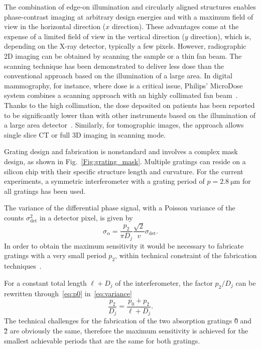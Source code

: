 The combination of edge-on illumination and circularly aligned structures
enables phase-contrast imaging at arbitrary design energies and with a
maximum field of view in the horizontal direction ($x$ direction). These
advantages come at the expense of a limited field of view in the vertical
direction ($y$ direction), which is, depending on the X-ray detector,
typically a few pixels. However, radiographic 2D imaging can be obtained by
scanning the sample or a thin fan beam. The scanning technique has been
demonstrated to deliver less dose than the conventional approach based on
the illumination of a large area. In digital mammography, for instance,
where dose is a critical issue, Philips' MicroDose system combines a
scanning approach with an highly collimated fan beam~\cite{Aslund2007}.
Thanks to the high collimation, the dose deposited on  patients has been
reported to be significantly lower than with other instruments based on the
illumination of a large area detector~\cite{Oduko2010}. Similarly, for
tomographic images, the approach allows single slice \ac{CT} or full 3D
imaging in scanning mode.

Grating design and fabrication is nonstandard and involves a complex mask
design, as shown in Fig.~\ref{Fig:grating_mask}. Multiple gratings can reside on a
silicon chip with their specific structure length and curvature. For the
current experiments, a symmetric interferometer with a grating period of $p
= \SI{2.8}{\micro\metre}$ for all gratings has been used.

The variance of the differential phase signal, with a Poisson variance of
the counts $\sigma_{\text{det}}^2$ in a detector pixel, is given by~\cite{Raupach2011}
\begin{equation}
    \sigma_\alpha = \frac{p_2}{\pi D_j}
    \frac{\sqrt{2}}{v}\sigma_{\text{det}}.\label{eq:variance}
\end{equation}
In order to obtain the maximum sensitivity it would be necessary to
fabricate gratings with a very small period
$p_2$, within technical constraint of the fabrication
techniques~\cite{David2007,Kenntner2010}.

For a constant total length $\ell + D_j$ of the interferometer, the factor
$p_2/D_j$ can be rewritten through~\eqref{eq:p0} in~\eqref{eq:variance}
\begin{equation*}
    \frac{p_2}{D_j} = \frac{p_0 + p_2}{\ell + D_j}.
\end{equation*}
The technical challenges for the fabrication of the two absorption gratings
\G0 and \G2 are obviously the same, therefore the maximum sensitivity is
achieved for the smallest achievable periods that are the same for both
gratings.

